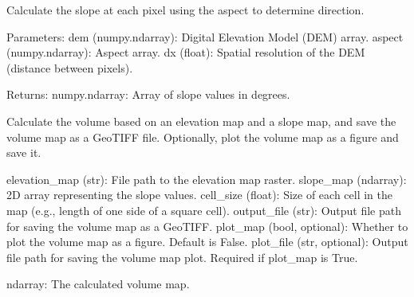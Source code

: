 \documentclass[letterpaper,10pt,english]{sphinxmanual}
\begin{document}

\begin{fulllineitems}
\label{\detokenize{akhdefo_functions:akhdefo_functions.Akhdefo_Tools.calculate_slope}}
\pysigstartsignatures
{}
\pysigstopsignatures
\sphinxAtStartPar
Calculate the slope at each pixel using the aspect to determine direction.

\sphinxAtStartPar
Parameters:
dem (numpy.ndarray): Digital Elevation Model (DEM) array.
aspect (numpy.ndarray): Aspect array.
dx (float): Spatial resolution of the DEM (distance between pixels).

\sphinxAtStartPar
Returns:
numpy.ndarray: Array of slope values in degrees.

\end{fulllineitems}


\begin{fulllineitems}
\label{\detokenize{akhdefo_functions:akhdefo_functions.Akhdefo_Tools.calculate_volume}}
\pysigstartsignatures
{}
\pysigstopsignatures
\sphinxAtStartPar
Calculate the volume based on an elevation map and a slope map,
and save the volume map as a GeoTIFF file. Optionally, plot the volume map as a figure and save it.
\begin{description}
\sphinxAtStartPar
elevation\_map (str): File path to the elevation map raster.
slope\_map (ndarray): 2D array representing the slope values.
cell\_size (float): Size of each cell in the map (e.g., length of one side of a square cell).
output\_file (str): Output file path for saving the volume map as a GeoTIFF.
plot\_map (bool, optional): Whether to plot the volume map as a figure. Default is False.
plot\_file (str, optional): Output file path for saving the volume map plot. Required if plot\_map is True.

\sphinxAtStartPar
ndarray: The calculated volume map.

\end{description}

\end{fulllineitems}
\end{document}

